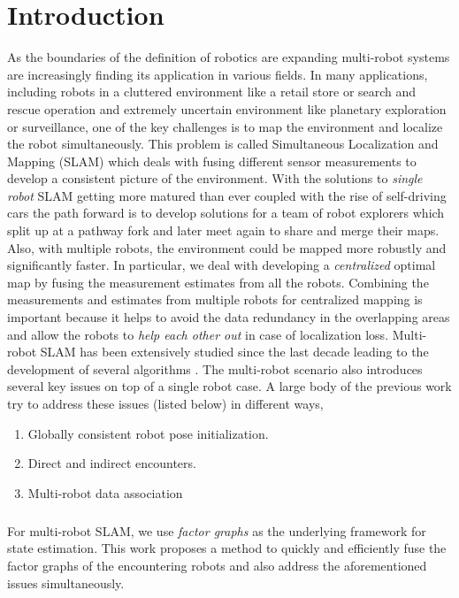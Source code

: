 \chapter{Introduction}

As the boundaries of the definition of robotics are expanding multi-robot systems are increasingly finding its application in various fields. In many applications, including robots in a cluttered environment like a retail store or search and rescue operation and extremely uncertain environment like planetary exploration or surveillance, one of the key challenges is to map the environment and localize the robot simultaneously. This problem is called Simultaneous Localization and Mapping (SLAM) which deals with fusing different sensor measurements to develop a consistent picture of the environment. With the solutions to \textit{single robot} SLAM getting more matured than ever coupled with the rise of self-driving cars the path forward is to develop solutions for a team of robot explorers which split up at a pathway fork and later meet again to share and merge their maps. Also, with multiple robots, the environment could be mapped more robustly and significantly faster. In particular, we deal with developing a \textit{centralized} optimal map by fusing the measurement estimates from all the robots. Combining the measurements and estimates from multiple robots for centralized mapping is important because it helps to avoid the data redundancy in the overlapping areas and allow the robots to \textit{help each other out} in case of localization loss. Multi-robot SLAM has been extensively studied since the last decade leading to the development of several algorithms \cite{howardmulti,thrunmulti,zhoumulti}. The multi-robot scenario also introduces several key issues on top of a single robot case. A large body of the previous work try to address these issues (listed below) in different ways, 

\begin{enumerate}
\item Globally consistent robot pose initialization.
\item Direct and indirect encounters.
\item Multi-robot data association
\end{enumerate} 

\paragraph{}
For multi-robot SLAM, we use \textit{factor graphs} \cite{factorgraph} as the underlying framework for state estimation. This work proposes a method to quickly and efficiently fuse the factor graphs of the encountering robots and also address the aforementioned issues simultaneously.

